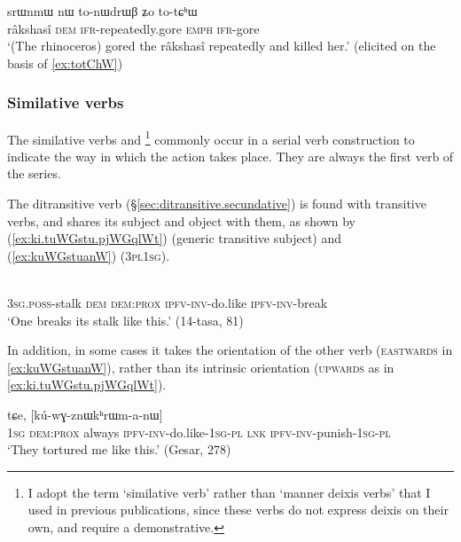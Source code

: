 \begin{exe}
\ex \label{ex:totChW2}
\gll srɯnmɯ nɯ to-nɯdrɯβ ʑo to-tɕʰɯ \\
 râkshasî \textsc{dem}  \textsc{ifr}-repeatedly.gore  \textsc{emph}  \textsc{ifr}-gore \\
 \glt `(The rhinoceros) gored the râkshasî repeatedly and killed her.' (elicited on the basis of \ref{ex:totChW})
\end{exe}	

\subsubsection{Similative verbs} \label{sec:svc.similative.verb}
The similative verbs  and \footnote{I adopt the term `similative verb' \citep{creissels17similative} rather than `manner deixis verbs' that I used in previous publications, since these verbs do not express deixis on their own, and require a demonstrative. } commonly occur in a serial verb construction to indicate the way in which the action takes place. They are always the first verb of the series. 

The ditransitive verb  (§\ref{sec:ditransitive.secundative}) is found with transitive verbs, and shares its subject and object with them, as shown by (\ref{ex:ki.tuWGstu.pjWGqlWt}) (generic transitive subject) and (\ref{ex:kuWGstuanW}) (\textsc{3pl}\fl{}\textsc{1sg}).

\begin{exe}
\ex \label{ex:ki.tuWGstu.pjWGqlWt}
 \\
\textsc{3sg}.\textsc{poss}-stalk \textsc{dem} \textsc{dem}:\textsc{prox} \textsc{ipfv}-\textsc{inv}-do.like \textsc{ipfv}-\textsc{inv}-break \\
\glt `One breaks its stalk like this.' (14-tasa, 81)
\end{exe}	

In addition, in some cases it takes the orientation of the other verb (\textsc{eastwards} in \ref{ex:kuWGstuanW}), rather than its intrinsic orientation (\textsc{upwards} as in \ref{ex:ki.tuWGstu.pjWGqlWt}).

\begin{exe}
\ex \label{ex:kuWGstuanW}
 tɕe, [kú-wɣ-znɯkʰrɯm-a-nɯ] \\
 \textsc{1sg} \textsc{dem}:\textsc{prox} always \textsc{ipfv}-\textsc{inv}-do.like-\textsc{1sg}-\textsc{pl} \textsc{lnk} \textsc{ipfv}-\textsc{inv}-punish-\textsc{1sg}-\textsc{pl} \\
 \glt `They tortured me like this.' (Gesar, 278)
\end{exe}	

